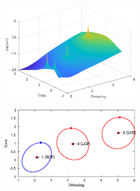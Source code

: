 \begin{figure}
	\centering
	\begin{subfigure}{0.48\linewidth}
		\begin{subfigure}{\linewidth}
			\includegraphics[width=\linewidth]{plots/hybrid_defect/pi_2/surface}
			\caption{}
			\label{fig:hybrid_defect:surf}
		\end{subfigure}
		\begin{subfigure}{\linewidth}
			\includegraphics[width=\linewidth]{plots/hybrid_defect/pi_2/modes_found}
			\caption{}
			\label{fig:hybrid_defect:modes}
		\end{subfigure}
	\end{subfigure}
	\begin{subfigure}{0.48\linewidth}

\end{subfigure}
\end{figure}
